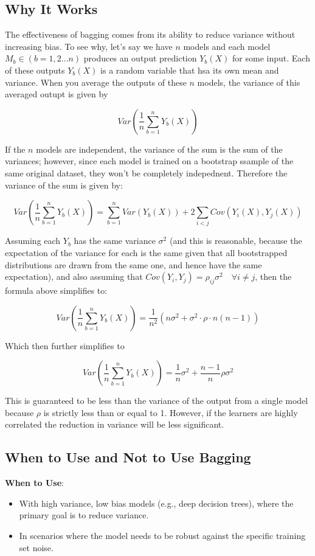 \documentclass[12pt]{article}
\begin{document}
\subsection{Why It Works}

The effectiveness of bagging comes from its ability to reduce variance without increasing bias. To see why, let's say we have \(n\) models and each model \(M_b \in (b=1,2...n)\) produces an output prediction \(Y_b(X)\) for some input. Each of these outputs \(Y_b(X)\)  is a random variable that hsa its own mean and variance. When you average the outputs of these \(n\) models, the variance of this averaged outupt is given by 

\[Var\left(\frac{1}{n}\sum_{b=1}^nY_b(X)\right)\]

If the \(n\) models are independent, the variance of the sum is the sum of the variances; however, since each model is trained on a bootstrap ssample of the same original dataset, they won't be completely indepednent. Therefore the variance of the sum is given by:

\[Var\left(\frac{1}{n}\sum_{b=1}^nY_b(X)\right) = \sum_{b=1}^nVar(Y_b(X)) + 2\sum_{i<j}Cov(Y_i(X), Y_j(X))\]

Assuming each \(Y_b\) has the same variance \(\sigma^2\) (and this is reasonable, because the expectation of the variance for each is the same given that all bootstrapped distributions are drawn from the same one, and hence have the same expectation), and also assuming that \(Cov(Y_i, Y_j) = \rho_{ij}\sigma^2 \quad \forall i \neq j\), then the formula above simplifies to:

\[Var\left(\frac{1}{n}\sum_{b=1}^nY_b(X)\right)  = \frac{1}{n^2}\left(n\sigma^2 + \sigma^2\cdot \rho \cdot n(n-1) \right)\]

Which then further simplifies to

\[Var\left(\frac{1}{n}\sum_{b=1}^nY_b(X)\right)  = \frac{1}{n}\sigma^2 + \frac{n-1}{n}\rho \sigma^2\]

This is guaranteed to be less than the variance of the output from a single model because \(\rho\) is strictly less than or equal to 1. However, if the learners are highly correlated the reduction in variance will be less significant. 

\subsection{When to Use and Not to Use Bagging}

\textbf{When to Use}:
\begin{itemize}
    \item With high variance, low bias models (e.g., deep decision trees), where the primary goal is to reduce variance.
    \item In scenarios where the model needs to be robust against the specific training set noise.
\end{itemize}
\end{document}
